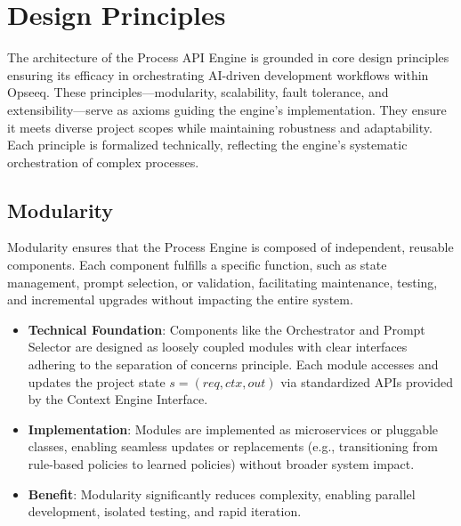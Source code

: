 \documentclass[11pt,a4paper]{article}
\begin{document}
\section{Design Principles}
\label{sec:principles}

The architecture of the Process API Engine is grounded in core design principles ensuring its efficacy in orchestrating AI-driven development workflows within Opseeq. These principles—modularity, scalability, fault tolerance, and extensibility—serve as axioms guiding the engine’s implementation. They ensure it meets diverse project scopes while maintaining robustness and adaptability. Each principle is formalized technically, reflecting the engine’s systematic orchestration of complex processes.

\subsection{Modularity}
\label{subsec:modularity}

Modularity ensures that the Process Engine is composed of independent, reusable components. Each component fulfills a specific function, such as state management, prompt selection, or validation, facilitating maintenance, testing, and incremental upgrades without impacting the entire system.

\begin{itemize}
    \item \textbf{Technical Foundation}: 
    Components like the Orchestrator and Prompt Selector are designed as loosely coupled modules with clear interfaces adhering to the separation of concerns principle. Each module accesses and updates the project state \( s = (req, ctx, out) \) via standardized APIs provided by the Context Engine Interface.

    \item \textbf{Implementation}: 
    Modules are implemented as microservices or pluggable classes, enabling seamless updates or replacements (e.g., transitioning from rule-based policies to learned policies) without broader system impact.

    \item \textbf{Benefit}: 
    Modularity significantly reduces complexity, enabling parallel development, isolated testing, and rapid iteration.
\end{itemize}
\end{document}
